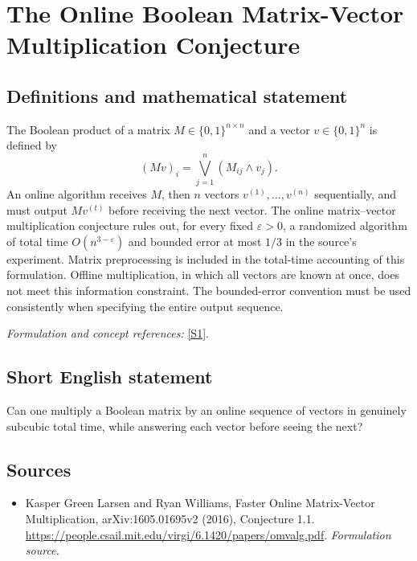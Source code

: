 \documentclass[11pt]{article}
\begin{document}
\section*{\texorpdfstring{The Online Boolean Matrix-Vector Multiplication Conjecture}{The Online Boolean Matrix-Vector Multiplication Conjecture}}\label{311}
\subsection{Definitions and mathematical statement}
The Boolean product of a matrix $M\in\{0,1\}^{n\times n}$ and a vector $v\in\{0,1\}^n$ is defined by
\[
 (Mv)_i=\bigvee_{j=1}^n(M_{ij}\wedge v_j).
\]
An online algorithm receives $M$, then $n$ vectors $v^{(1)},\ldots,v^{(n)}$ sequentially, and must output $Mv^{(t)}$ before receiving the next vector. The online matrix--vector multiplication conjecture rules out, for every fixed ${\varepsilon}>0$, a randomized algorithm of total time $O(n^{3-{\varepsilon}})$ and bounded error at most $1/3$ in the source's experiment. Matrix preprocessing is included in the total-time accounting of this formulation. Offline multiplication, in which all vectors are known at once, does not meet this information constraint. The bounded-error convention must be used consistently when specifying the entire output sequence.
\par\smallskip\textit{Formulation and concept references:} \href{https://people.csail.mit.edu/virgi/6.1420/papers/omvalg.pdf}{[S1]}.

\subsection{Short English statement}
Can one multiply a Boolean matrix by an online sequence of vectors in genuinely subcubic total time, while answering each vector before seeing the next?
\subsection{Sources}
\begin{itemize}
\item[S1]Kasper Green Larsen and Ryan Williams, Faster Online Matrix-Vector Multiplication, arXiv:1605.01695v2 (2016), Conjecture 1.1.
\url{https://people.csail.mit.edu/virgi/6.1420/papers/omvalg.pdf}.
\textit{Formulation source.}
\end{itemize}
\end{document}
